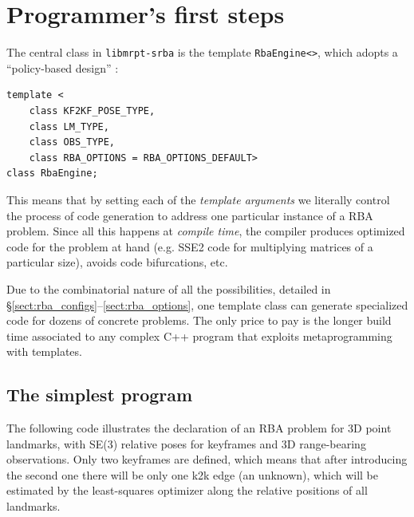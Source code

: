 \documentclass[a4paper,11pt]{article}
\begin{document}
\newpage


\section{Programmer's first steps}
\label{sect:program_first}

The central class in \texttt{libmrpt-srba} is the template \texttt{RbaEngine<>}, which 
adopts a ``policy-based design'' \cite{andrei2001modern}:

\begin{lstlisting}
template <
	class KF2KF_POSE_TYPE,
	class LM_TYPE,
	class OBS_TYPE, 
	class RBA_OPTIONS = RBA_OPTIONS_DEFAULT>
class RbaEngine;
\end{lstlisting}

This means that by setting each of the \emph{template arguments} we literally control the process 
of code generation to address one particular instance of a RBA problem. 
Since all this happens at \emph{compile time}, the compiler produces optimized code for 
the problem at hand (e.g. SSE2 code for multiplying matrices of a particular size), 
avoids code bifurcations, etc.

Due to the combinatorial nature of all the possibilities, 
detailed in \S\ref{sect:rba_configs}--\ref{sect:rba_options}, one template class 
can generate specialized code for dozens of concrete problems. 
The only price to pay is the longer build time associated to any complex C++ program 
that exploits metaprogramming with templates.


\subsection{The simplest program}

The following code illustrates the declaration of an RBA problem for 3D point landmarks, 
with SE(3) relative poses for keyframes and 3D range-bearing observations. 
Only two keyframes are defined, which means that after introducing the second one
there will be only one k2k edge (an unknown), which will be estimated by the least-squares 
optimizer along the relative positions of all landmarks.
\end{document}
